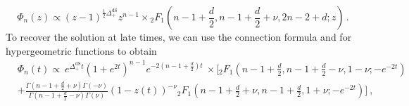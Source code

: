 \documentclass[a4paper,11pt]{article}
\begin{document}
\begin{equation}
    \Phi_n(z) \propto (z-1)^{\frac{1}{2}\Delta_+^{\text{dS}}}z^{n-1} \times {}_2F_1(n-1+\frac{d}{2},n-1+\frac{d}{2}+\nu,2n-2+d;z)\,.
\end{equation}
To recover the solution at late times, we can use the connection formula and for hypergeometric functions to obtain
\begin{equation}
    \begin{aligned}
        &\Phi_n(t)\propto ~e^{\Delta_+^{\text{dS}}t}(1+e^{2t})^{n-1} e^{-2(n-1+\frac{d}{2})t}~\times \Bigg[{}_2F_1\left(n-1+\frac{d}{2},n-1+\frac{d}{2}-\nu,1-\nu;-e^{-2t}\right)
        \\&+\frac{\Gamma(n-1+\frac{d}{2}+\nu)\Gamma(-\nu)}{\Gamma(n-1+\frac{d}{2}-\nu)\Gamma(\nu)}(1-z(t))^{-\nu}{}_2F_1\left(n-1+\frac{d}{2}+\nu,n-1+\frac{d}{2},1+\nu;-e^{-2t}\right)\Bigg]~,
    \end{aligned}
\end{equation}
\end{document}
